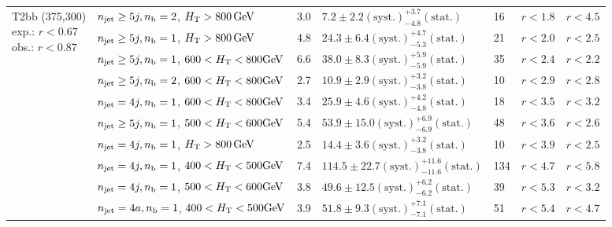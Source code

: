 \begin{table}[h!]
\begin{tabular}{ lllllll }
\multirow{10}{*}{\parbox[t]{2.3cm}{T2bb (375,300)\\exp.: $r<0.67$\\obs.: $r<0.87$}}
 & $n_{\mathrm{jet}} \geq5j,n_{\text{b}} =2$, $\mbox{$H_\text{T}$} > 800 \, \mathrm{GeV}$ & 3.0 & $7.2 \pm 2.2 \mathrm{(syst.)} ^{+3.7}_{-4.8} \mathrm{(stat.)}$ & 16 & $r < 1.8$ & $r < 4.5$\\ 
 & $n_{\mathrm{jet}} \geq5j,n_{\text{b}} =1$, $\mbox{$H_\text{T}$} > 800 \, \mathrm{GeV}$ & 4.8 & $24.3 \pm 6.4 \mathrm{(syst.)} ^{+4.7}_{-5.3} \mathrm{(stat.)}$ & 21 & $r < 2.0$ & $r < 2.5$\\ 
 & $n_{\mathrm{jet}} \geq5j,n_{\text{b}} =1$, $600 < \mbox{$H_\text{T}$} < 800 \mathrm{GeV}$ & 6.6 & $38.0 \pm 8.3 \mathrm{(syst.)} ^{+5.9}_{-5.9} \mathrm{(stat.)}$ & 35 & $r < 2.4$ & $r < 2.2$\\ 
 & $n_{\mathrm{jet}} \geq5j,n_{\text{b}} =2$, $600 < \mbox{$H_\text{T}$} < 800 \mathrm{GeV}$ & 2.7 & $10.9 \pm 2.9 \mathrm{(syst.)} ^{+3.2}_{-3.8} \mathrm{(stat.)}$ & 10 & $r < 2.9$ & $r < 2.8$\\ 
 & $n_{\mathrm{jet}} =4j,n_{\text{b}} =1$, $600 < \mbox{$H_\text{T}$} < 800 \mathrm{GeV}$ & 3.4 & $25.9 \pm 4.6 \mathrm{(syst.)} ^{+4.2}_{-4.8} \mathrm{(stat.)}$ & 18 & $r < 3.5$ & $r < 3.2$\\ 
 & $n_{\mathrm{jet}} \geq5j,n_{\text{b}} =1$, $500 < \mbox{$H_\text{T}$} < 600 \mathrm{GeV}$ & 5.4 & $53.9 \pm 15.0 \mathrm{(syst.)} ^{+6.9}_{-6.9} \mathrm{(stat.)}$ & 48 & $r < 3.6$ & $r < 2.6$\\ 
 & $n_{\mathrm{jet}} =4j,n_{\text{b}} =1$, $\mbox{$H_\text{T}$} > 800 \, \mathrm{GeV}$ & 2.5 & $14.4 \pm 3.6 \mathrm{(syst.)} ^{+3.2}_{-3.8} \mathrm{(stat.)}$ & 10 & $r < 3.9$ & $r < 2.5$\\ 
 & $n_{\mathrm{jet}} =4j,n_{\text{b}} =1$, $400 < \mbox{$H_\text{T}$} < 500 \mathrm{GeV}$ & 7.4 & $114.5 \pm 22.7 \mathrm{(syst.)} ^{+11.6}_{-11.6} \mathrm{(stat.)}$ & 134 & $r < 4.7$ & $r < 5.8$\\ 
 & $n_{\mathrm{jet}} =4j,n_{\text{b}} =1$, $500 < \mbox{$H_\text{T}$} < 600 \mathrm{GeV}$ & 3.8 & $49.6 \pm 12.5 \mathrm{(syst.)} ^{+6.2}_{-6.2} \mathrm{(stat.)}$ & 39 & $r < 5.3$ & $r < 3.2$\\ 
 & $n_{\mathrm{jet}} =4a,n_{\text{b}} =1$, $400 < \mbox{$H_\text{T}$} < 500 \mathrm{GeV}$ & 3.9 & $51.8 \pm 9.3 \mathrm{(syst.)} ^{+7.1}_{-7.1} \mathrm{(stat.)}$ & 51 & $r < 5.4$ & $r < 4.7$\\ \hline
    \hline
  \end{tabular}
\end{table}

